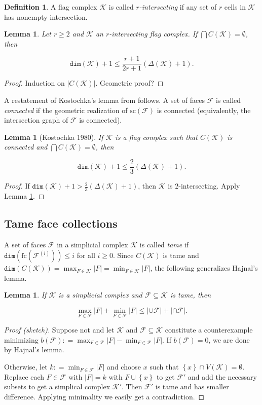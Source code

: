 \documentclass[12pt]{article}
\theoremstyle{plain}
\newtheorem{lem}[thm]{Lemma}
\theoremstyle{definition}
\newtheorem{defn}{Definition}
\theoremstyle{remark}
\newcommand{\fancy}[1]{\mathcal{#1}}
\newcommand{\set}[1]{\left\{ #1 \right\}}
\newcommand{\card}[1]{\left|#1\right|}
\newcommand{\parens}[1]{\left( #1 \right)}
\newcommand{\DefinedAs}{\mathrel{\mathop:}=}
\def\K{\fancy{K}}
\def\F{\fancy{F}}
\def\dim{\mathtt{dim}}
\renewcommand{\sc}[1]{\text{sc}\parens{#1}}
\newcommand{\fc}[1]{\text{fc}\parens{#1}}
\begin{document}
\begin{defn}
A flag complex $\K$ is called \emph{$r$-intersecting} if any set of $r$ cells in $\K$ has nonempty intersection.
\end{defn}

\begin{lem}\label{KostochkaGeneralized}
Let $r \geq 2$ and $\K$ an $r$-intersecting flag complex.  If $\bigcap C(\K) = \emptyset$, then

\[\dim(\K) + 1 \leq \frac{r+1}{2r+1}\parens{\Delta(\K) + 1}.\]
\end{lem}
\begin{proof}
Induction on $\card{C(\K)}$.  Geometric proof?
\end{proof}

A restatement of Kostochka's lemma from \cite{kostochkaRussian} follows.  A set of faces $\F$ is called \emph{connected} if the geometric realization of $\sc{\F}$ is connected (equivalently, the intersection graph of $\F$ is connected).

\begin{lem}[Kostochka 1980]\label{KostochkaLemma}
If $\K$ is a flag complex such that $C(\K)$ is connected and $\bigcap C(\K) = \emptyset$, then

\[\dim(\K) + 1 \leq \frac{2}{3}\parens{\Delta(\K) + 1}.\]
\end{lem}
\begin{proof}
If $\dim(\K) + 1 > \frac{2}{3}\parens{\Delta(\K) + 1}$, then $\K$ is $2$-intersecting.  Apply Lemma \ref{KostochkaGeneralized}.
\end{proof}

\subsection{Tame face collections}
A set of faces $\F$ in a simplicial complex $\K$ is called \emph{tame} if $\dim(\fc{\F^{(i)}}) \leq i$ for all $i \geq 0$.  Since $C(\K)$ is tame and $\dim(C(\K)) = \max_{F \in \K} \card{F} = \min_{F \in \K} \card{F}$, the following generalizes Hajnal's lemma.

\begin{lem}
If $\K$ is a simplicial complex and $\F \subseteq \K$ is tame, then

\[\max_{F \in \F} \card{F} + \min_{F \in \F} \card{F} \leq \card{\cup \F} + \card{\cap \F}.\]
\end{lem}
\begin{proof}[Proof (sketch)]
Suppose not and let $\K$ and $\F \subseteq \K$ constitute a counterexample minimizing $b(\F) \DefinedAs \max_{F \in \F} \card{F} - \min_{F \in \F} \card{F}$.  If $b(\F) = 0$, we are done by Hajnal's lemma. 

Otherwise, let $k \DefinedAs \min_{F \in \F} \card{F}$ and choose $x$ such that $\set{x} \cap V(\K) = \emptyset$.  Replace each $F \in \F$ with $\card{F} = k$ with $F \cup \set{x}$ to get $\F'$ and add the necessary subsets to get a simplical complex $\K'$.  Then $\F'$ is tame and has smaller difference.  Applying minimality we easily get a contradiction.
\end{proof}
\end{document}
